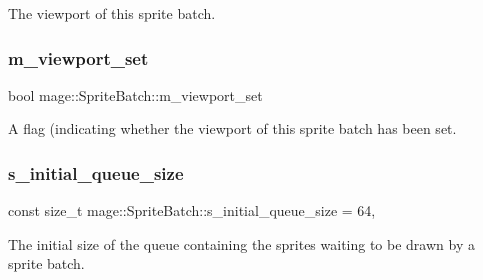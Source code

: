 The viewport of this sprite batch. \hypertarget{classmage_1_1_sprite_batch_aefa38f98b30d09e3521ccdcc12bac6d0}{}\label{classmage_1_1_sprite_batch_aefa38f98b30d09e3521ccdcc12bac6d0} 
\subsubsection{\texorpdfstring{m\+\_\+viewport\+\_\+set}{m\_viewport\_set}}
{\footnotesize\ttfamily bool mage\+::\+Sprite\+Batch\+::m\+\_\+viewport\+\_\+set\hspace{0.3cm}{\ttfamily [private]}}

A flag (indicating whether the viewport of this sprite batch has been set. \hypertarget{classmage_1_1_sprite_batch_af649a6e9655bb8088d4c5d1e31281927}{}\label{classmage_1_1_sprite_batch_af649a6e9655bb8088d4c5d1e31281927} 
\subsubsection{\texorpdfstring{s\+\_\+initial\+\_\+queue\+\_\+size}{s\_initial\_queue\_size}}
{\footnotesize\ttfamily const size\+\_\+t mage\+::\+Sprite\+Batch\+::s\+\_\+initial\+\_\+queue\+\_\+size = 64\hspace{0.3cm}{\ttfamily [static]}, {\ttfamily [private]}}

The initial size of the queue containing the sprites waiting to be drawn by a sprite batch. 